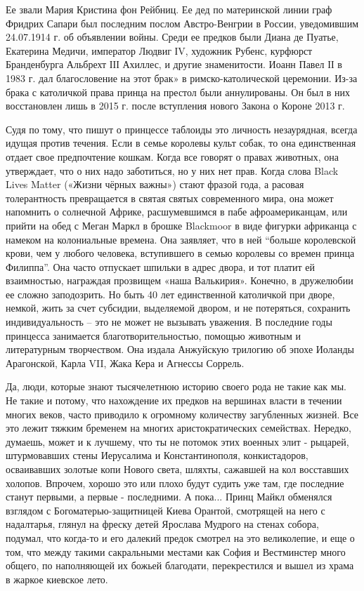 Ее звали Мария Кристина фон Рейбниц. Ее дед по материнской линии граф Фридрих
Сапари был последним послом Австро-Венгрии в России, уведомившим 24.07.1914 г.
об объявлении войны. Среди ее предков были Диана де Пуатье, Екатерина Медичи,
император Людвиг ІV, художник Рубенс, курфюрст Бранденбурга Альбрехт ІІІ
Ахиллес, и другие знаменитости. Иоанн Павел ІІ в 1983 г. дал благословение на
этот брак» в римско-католической церемонии. Из-за брака с католичкой права
принца на престол были аннулированы. Он был в них восстановлен лишь в 2015 г.
после вступления нового Закона о Короне 2013 г. 


Судя по тому, что пишут о
принцессе таблоиды это личность незаурядная, всегда идущая против течения. Если
в семье королевы культ собак, то она единственная отдает свое предпочтение
кошкам. Когда все говорят о правах животных, она утверждает, что о них надо
заботиться, но у них нет прав. Когда слова Black Lives Matter («Жизни чёрных
важны») стают фразой года, а расовая толерантность превращается в святая святых
современного мира, она может напомнить о солнечной Африке, расшумевшимся в пабе
афроамериканцам, или прийти на обед с Меган Маркл в брошке Blackmoor в виде
фигурки африканца с намеком на колониальные времена. Она заявляет, что в ней
\enquote{больше королевской крови, чем у любого человека, вступившего в семью королевы
со времен принца Филиппа}. Она часто отпускает шпильки в адрес двора, и тот
платит ей взаимностью, награждая прозвищем «наша Валькирия». Конечно, в
дружелюбии ее сложно заподозрить. Но быть 40 лет единственной католичкой при
дворе, немкой, жить за счет субсидии, выделяемой двором, и не потеряться,
сохранить индивидуальность – это не может не вызывать уважения. В последние
годы принцесса занимается благотворительностью, помощью животным и литературным
творчеством. Она издала Анжуйскую трилогию об эпохе Иоланды Арагонской, Карла
VII, Жака Кера и Агнессы Соррель.


Да, люди, которые знают тысячелетнюю историю своего рода не такие как мы. Не
такие и потому, что нахождение их предков на вершинах власти в течении многих
веков, часто приводило  к огромному количеству загубленных жизней. Все это
лежит тяжким бременем на многих аристократических семействах. Нередко, думаешь,
может и к лучшему, что ты не потомок этих  военных элит - рыцарей, штурмовавших
стены Иерусалима и Константинополя, конкистадоров, осваивавших золотые копи
Нового света, шляхты, сажавшей на кол восставших холопов. Впрочем, хорошо это
или плохо будут судить уже там, где последние станут первыми, а первые -
последними. А пока... Принц Майкл обменялся взглядом с Богоматерью-защитницей
Киева Орантой, смотрящей на него с надалтарья, глянул на фреску детей Ярослава
Мудрого на стенах собора, подумал, что когда-то и его далекий предок смотрел на
это великолепие, и еще о том, что между такими сакральными местами как София и
Вестминстер много общего, по наполняющей их божьей благодати, перекрестился и
вышел из храма в жаркое киевское лето.

